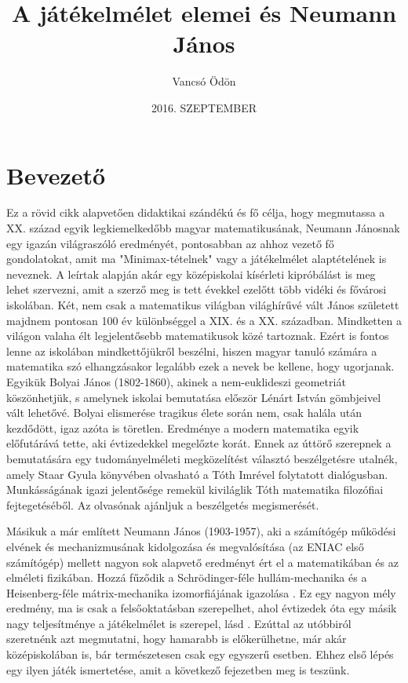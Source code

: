 \documentclass  {article}
\begin{document}
 
 \author{Vancsó Ödön}
 
\date{2016. SZEPTEMBER}
\title{A játékelmélet elemei és Neumann János}



\section{Bevezető}

Ez a rövid cikk alapvetően didaktikai szándékú és fő célja, hogy megmutassa a XX. század egyik legkiemelkedőbb magyar matematikusának, Neumann Jánosnak egy igazán világraszóló eredményét, pontosabban az ahhoz vezető fő gondolatokat, amit ma "Minimax-tételnek"  vagy a játékelmélet alaptételének is neveznek. A leírtak alapján akár egy középiskolai kísérleti kipróbálást is meg lehet szervezni, amit a szerző meg is tett évekkel ezelőtt több vidéki és fővárosi iskolában.
Két, nem csak a matematikus világban világhírűvé vált János született majdnem pontosan 100 év különbséggel a XIX. és a XX. században. Mindketten a világon valaha élt legjelentősebb matematikusok közé tartoznak. Ezért is fontos lenne az iskolában mindkettőjükről beszélni, hiszen magyar tanuló számára a matematika szó elhangzásakor legalább ezek a nevek be kellene, hogy ugorjanak. Egyikük Bolyai János (1802-1860), akinek a nem-euklideszi geometriát köszönhetjük, s amelynek iskolai bemutatása először Lénárt István   gömbjeivel vált lehetővé. Bolyai elismerése tragikus élete során nem, csak halála után kezdődött, igaz azóta is töretlen. 
Eredménye a modern matematika egyik előfutárává tette, aki évtizedekkel megelőzte korát. Ennek az úttörő szerepnek a bemutatására egy tudományelméleti megközelítést választó beszélgetésre utalnék, amely Staar Gyula könyvében \cite{staar} olvasható a Tóth Imrével folytatott dialógusban. Munkásságának igazi jelentősége remekül kiviláglik Tóth matematika filozófiai fejtegetéséből. Az olvasónak ajánljuk a beszélgetés megismerését.


Másikuk a már említett Neumann János (1903-1957), aki a számítógép működési elvének és mechanizmusának kidolgozása és megvalósítása (az ENIAC első számítógép) mellett nagyon sok alapvető eredményt ért el a matematikában és az elméleti fizikában. Hozzá fűződik a Schrödinger-féle hullám-mechanika és a Heisenberg-féle mátrix-mechanika izomorfiájának igazolása \cite{neumann}.
Ez egy nagyon mély eredmény, ma is csak a felsőoktatásban szerepelhet, ahol évtizedek óta egy másik nagy teljesítménye a játékelmélet is szerepel, lásd \cite{morgenstern}. Ezúttal az utóbbiról szeretnénk azt megmutatni, hogy hamarabb is előkerülhetne, már akár középiskolában is, bár természetesen csak egy egyszerű esetben. Ehhez első lépés egy ilyen játék ismertetése, amit a következő fejezetben meg is teszünk.
\end{document}
